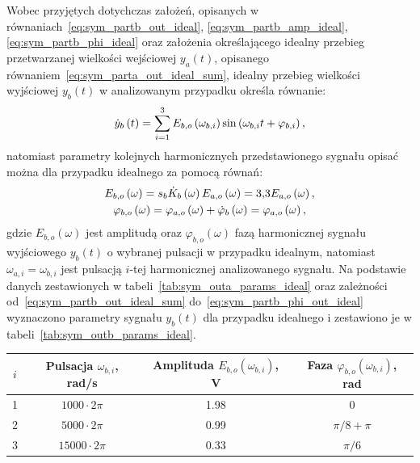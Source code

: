 Wobec przyjętych dotychczas założeń, opisanych w równaniach~\eqref{eq:sym_partb_out_ideal}, \eqref{eq:sym_partb_amp_ideal}, \eqref{eq:sym_partb_phi_ideal} oraz założenia określającego idealny przebieg przetwarzanej wielkości wejściowej $y_{a}(t)$, opisanego równaniem~\eqref{eq:sym_parta_out_ideal_sum}, idealny przebieg wielkości wyjściowej $y_{b}(t)$ w analizowanym przypadku określa równanie:
\begin{equation}
\dot{y}_{b} \left(t\right) = \sum _{i=1} ^{3} E_{b,o} \left(\omega_{b,i}\right) \sin \left(\omega_{b,i} t + \varphi_{b,i}\right) \label{eq:sym_partb_out_ideal_sum},
\end{equation}
natomiast parametry kolejnych harmonicznych przedstawionego sygnału opisać można dla przypadku idealnego za pomocą równań:
\begin{gather}
E_{b,o} \left(\omega\right) = s_{b} \dot{K}_{b} \left(\omega\right) E_{a,o} \left(\omega\right) = \num{3.3} E_{a,o} \left(\omega\right) \label{eq:sym_partb_amp_out_ideal}, \\
\varphi_{b,o} \left(\omega\right) = \varphi_{a,o} \left(\omega\right) + \dot{\varphi}_{b} \left(\omega\right) = \varphi_{a,o} \left(\omega\right) \label{eq:sym_partb_phi_out_ideal},
\end{gather}
gdzie $E_{b,o}(\omega)$ jest amplitudą oraz $\varphi_{b,o}(\omega)$ fazą harmonicznej sygnału wyjściowego $y_{b}(t)$ o wybranej pulsacji w przypadku idealnym, natomiast $\omega_{a,i} = \omega_{b,i}$ jest pulsacją $i$-tej harmonicznej analizowanego sygnału. Na podstawie danych zestawionych w tabeli~\ref{tab:sym_outa_params_ideal} oraz zależności od~\eqref{eq:sym_partb_out_ideal_sum} do~\eqref{eq:sym_partb_phi_out_ideal} wyznaczono parametry sygnału $y_{b}(t)$ dla przypadku idealnego i zestawiono je w tabeli~\ref{tab:sym_outb_params_ideal}.

\begin{table}[htb!]
\begin{tabular}[c]{| c | c | c | c |} \hline
\textbf{$i$} & \textbf{Pulsacja $\omega_{b,i}$, rad/s} & \textbf{Amplituda $E_{b,o}(\omega_{b,i})$, V} & \textbf{Faza $\varphi_{b,o}(\omega_{b,i})$, rad} \\ \hline
1 & $1000  \cdot 2\pi$ &  \num{1.98} & $0$           \\ \hline
2 & $5000  \cdot 2\pi$ &  \num{0.99} & $\pi/8 + \pi$ \\ \hline
3 & $15000 \cdot 2\pi$ &  \num{0.33} & $\pi/6$       \\ \hline
\end{tabular}
\end{table}


